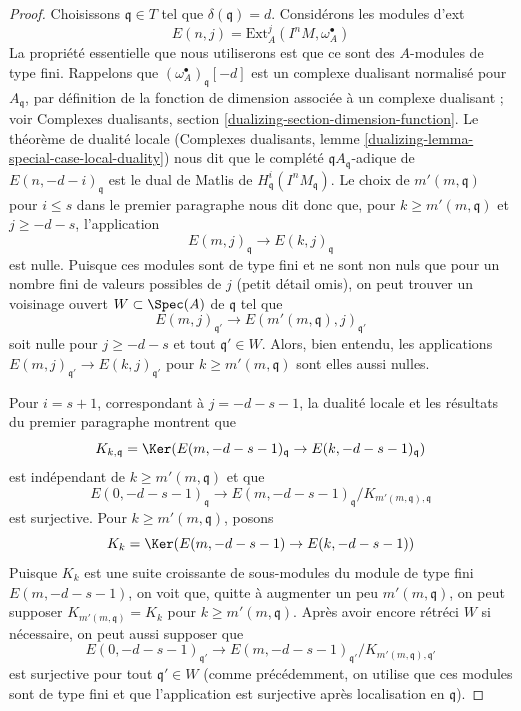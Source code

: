 \begin{proof}
\medskip\noindent
Choisissons $\mathfrak q \in T$ tel que $\delta(\mathfrak q) = d$.
Considérons les modules d'ext
$$
E(n, j) = \text{Ext}^j_A(I^nM, \omega_A^\bullet)
$$
La propriété essentielle que nous utiliserons est que ce sont des $A$-modules de type fini.
Rappelons que $(\omega_A^\bullet)_\mathfrak q[-d]$ est un complexe
dualisant normalisé pour $A_\mathfrak q$, par définition de la
fonction de dimension associée à un complexe dualisant ; voir
Complexes dualisants, section \ref{dualizing-section-dimension-function}.
Le théorème de dualité locale (Complexes dualisants, lemme
\ref{dualizing-lemma-special-case-local-duality}) nous dit que
le complété $\mathfrak qA_\mathfrak q$-adique de
$E(n, -d - i)_\mathfrak q$ est le dual de Matlis de
$H^i_\mathfrak q(I^nM_\mathfrak q)$. Le choix de
$m'(m, \mathfrak q)$ pour $i \leq s$ dans le premier paragraphe nous dit donc que,
pour $k \geq m'(m, \mathfrak q)$ et $j \geq -d - s$, l'application
$$
E(m, j)_\mathfrak q \to E(k, j)_\mathfrak q
$$
est nulle. Puisque ces modules sont de type fini et ne sont non nuls que
pour un nombre fini de valeurs possibles de $j$ (petit détail omis),
on peut trouver un voisinage ouvert $W \subset \Spec(A)$ de $\mathfrak q$
tel que
$$
E(m, j)_{\mathfrak q'} \to E(m'(m, \mathfrak q), j)_{\mathfrak q'}
$$
soit nulle pour $j \geq -d - s$ et tout $\mathfrak q' \in W$.
Alors, bien entendu, les applications $E(m, j)_{\mathfrak q'} \to E(k, j)_{\mathfrak q'}$
pour $k \geq m'(m, \mathfrak q)$ sont elles aussi nulles.

\medskip\noindent
Pour $i = s + 1$, correspondant à $j = - d - s - 1$, la dualité locale
et les résultats du premier paragraphe montrent que
$$
K_{k, \mathfrak q} =
\Ker(E(m, -d - s - 1)_\mathfrak q \to E(k, -d - s - 1)_\mathfrak q)
$$
est indépendant de $k \geq m'(m, \mathfrak q)$ et que
$$
E(0, -d - s - 1)_\mathfrak q \to
E(m, -d - s - 1)_\mathfrak q/K_{m'(m, \mathfrak q), \mathfrak q}
$$
est surjective. Pour $k \geq m'(m, \mathfrak q)$, posons
$$
K_k = \Ker(E(m, -d - s - 1) \to E(k, -d - s - 1))
$$
Puisque $K_k$ est une suite croissante de sous-modules du module de type fini
$E(m, -d - s - 1)$, on voit que, quitte à augmenter
un peu $m'(m, \mathfrak q)$, on peut supposer
$K_{m'(m, \mathfrak q)} = K_k$ pour $k \geq m'(m, \mathfrak q)$.
Après avoir encore rétréci $W$ si nécessaire, on peut aussi supposer que
$$
E(0, -d - s - 1)_{\mathfrak q'} \to
E(m, -d - s - 1)_{\mathfrak q'}/K_{m'(m, \mathfrak q), \mathfrak q'}
$$
est surjective pour tout $\mathfrak q' \in W$ (comme précédemment, on utilise que
ces modules sont de type fini
et que l'application est surjective après localisation en $\mathfrak q$).


\end{proof}
